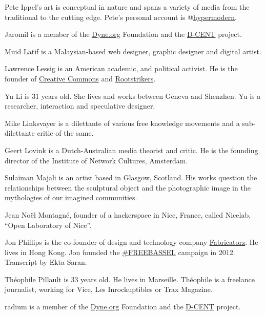 \protect\hypertarget{pete-ippel}{}{}Pete Ippel's art is conceptual in
nature and spans a variety of media from the traditional to the cutting
edge. Pete's personal account is
@\href{https://twitter.com/hypermodern}{hypermodern}.

\protect\hypertarget{jaromil}{}{}Jaromil is a member of the
\href{http://www.dyne.org}{Dyne.org} Foundation and the
\href{http://dcentproject.du}{D-CENT} project.

\protect\hypertarget{muid-latif}{}{}Muid Latif is a Malaysian-based web
designer, graphic designer and digital artist.

\protect\hypertarget{lawrence-lessig}{}{}Lawrence Lessig is an American
academic, and political activist. He is the founder of
\href{http://creativecommons.org/}{Creative Commons} and
\href{http://www.rootstrikers.org/}{Rootstrikers}.

\protect\hypertarget{yu-li}{}{}Yu Li is 31 years old. She lives and
works between Geneva and Shenzhen. Yu is a researcher, interaction and
speculative designer.

\protect\hypertarget{mike-linksvayer}{}{}Mike Linksvayer is a dilettante
of various free knowledge movements and a sub-dilettante critic of the
same.

\protect\hypertarget{geert-lovink}{}{}Geert Lovink is a Dutch-Australian
media theorist and critic. He is the founding director of the Institute
of Network Cultures, Amsterdam.

\protect\hypertarget{sulaiman-majali}{}{}Sulaïman Majali is an artist
based in Glasgow, Scotland. His works question the relationships between
the sculptural object and the photographic image in the mythologies of
our imagined communities.

\protect\hypertarget{jean-noel-montagne}{}{}Jean Noël Montagné, founder
of a hackerspace in Nice, France, called Nicelab, ``Open Laboratory of
Nice''.

\protect\hypertarget{jon-phillips}{}{}Jon Phillips is the co-founder of
design and technology company
\href{https://fabricatorz.com}{Fabricatorz}. He lives in Hong Kong. Jon
founded the \href{http://freebassel.org/}{\#FREEBASSEL} campaign in
2012. Transcript by Ekta Saran.

\protect\hypertarget{theophile-pillault}{}{}Théophile Pillault is 33
years old. He lives in Marseille. Théophile is a freelance journalist,
working for Vice, Les Inrockuptibles or Trax Magazine.

\protect\hypertarget{radium}{}{}radium is a member of the
\href{http://www.dyne.org}{Dyne.org} Foundation and the
\href{http://dcentproject.du}{D-CENT} project.

